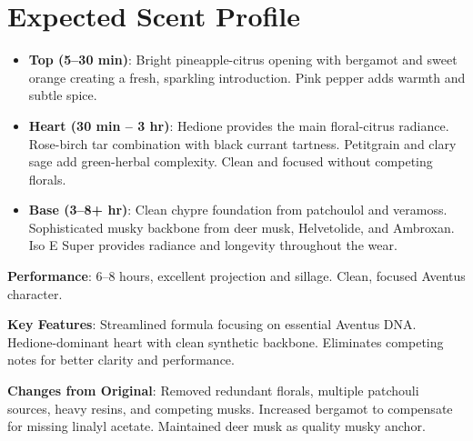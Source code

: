 \documentclass{article}
\begin{document}
\section{Expected Scent Profile}

\begin{itemize}
    \item \textbf{Top (5--30 min)}: Bright pineapple-citrus opening with bergamot and sweet orange creating a fresh, sparkling introduction. Pink pepper adds warmth and subtle spice.
    
    \item \textbf{Heart (30 min -- 3 hr)}: Hedione provides the main floral-citrus radiance. Rose-birch tar combination with black currant tartness. Petitgrain and clary sage add green-herbal complexity. Clean and focused without competing florals.
    
    \item \textbf{Base (3--8+ hr)}: Clean chypre foundation from patchoulol and veramoss. Sophisticated musky backbone from deer musk, Helvetolide, and Ambroxan. Iso E Super provides radiance and longevity throughout the wear.
\end{itemize}

\textbf{Performance}: 6--8 hours, excellent projection and sillage. Clean, focused Aventus character.

\textbf{Key Features}: Streamlined formula focusing on essential Aventus DNA. Hedione-dominant heart with clean synthetic backbone. Eliminates competing notes for better clarity and performance.

\textbf{Changes from Original}: Removed redundant florals, multiple patchouli sources, heavy resins, and competing musks. Increased bergamot to compensate for missing linalyl acetate. Maintained deer musk as quality musky anchor.
\end{document}

